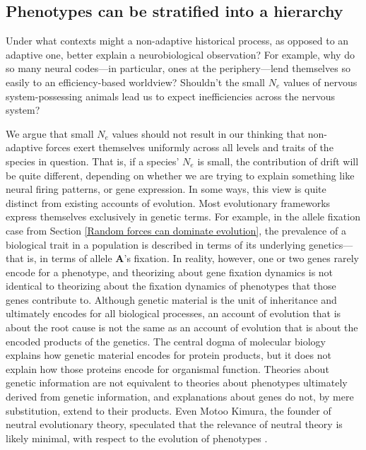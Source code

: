 \documentclass[twocolumn]{article}
\begin{document}
\subsection{Phenotypes can be stratified into a hierarchy}

Under what contexts might a non-adaptive historical process, as opposed to an adaptive one, better explain a neurobiological observation? For example, why do so many neural codes---in particular, ones at the periphery---lend themselves so easily to an efficiency-based worldview? Shouldn't the small $N_e$ values of nervous system-possessing animals lead us to expect inefficiencies across the nervous system? 

We argue that small $N_e$ values should not result in our thinking that non-adaptive forces exert themselves uniformly across all levels and traits of the species in question. That is, if a species' $N_e$ is small, the contribution of drift will be quite different, depending on whether we are trying to explain something like neural firing patterns, or gene expression. In some ways, this view is quite distinct from existing accounts of evolution. Most evolutionary frameworks express themselves exclusively in genetic terms. For example, in the allele fixation case from Section \ref{Random forces can dominate evolution}, the prevalence of a biological trait in a population is described in terms of its underlying genetics---that is, in terms of allele \textbf{A}'s fixation. In reality, however, one or two genes rarely encode for a phenotype, and theorizing about gene fixation dynamics is not identical to theorizing about the fixation dynamics of phenotypes that those genes contribute to. Although genetic material is the unit of inheritance and ultimately encodes for all biological processes, an account of evolution that is about the root cause is not the same as an account of evolution that is about the encoded products of the genetics. The central dogma of molecular biology \cite{crick_1970} explains how genetic material encodes for protein products, but it does not explain how those proteins encode for organismal function. Theories about genetic information are not equivalent to theories about phenotypes ultimately derived from genetic information, and explanations about genes do not, by mere substitution, extend to their products. Even Motoo Kimura, the founder of neutral evolutionary theory, speculated that the relevance of neutral theory is likely minimal, with respect to the evolution of phenotypes \cite{kimura1983neutral, kimura2020my, Zhang_2018}.
\end{document}
